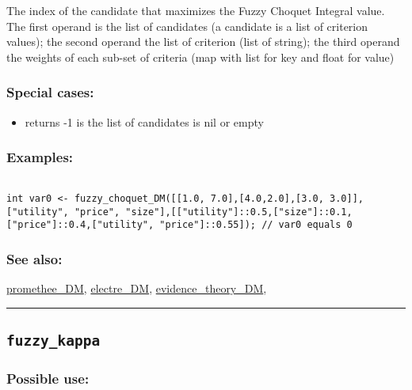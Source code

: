 \documentclass[]{book}
\providecommand{\tightlist}{%
  \setlength{\itemsep}{0pt}\setlength{\parskip}{0pt}}
\theoremstyle{definition}
\theoremstyle{definition}
\theoremstyle{definition}
\theoremstyle{remark}
\begin{document}
The index of the candidate that maximizes the Fuzzy Choquet Integral
value. The first operand is the list of candidates (a candidate is a
list of criterion values); the second operand the list of criterion
(list of string); the third operand the weights of each sub-set of
criteria (map with list for key and float for value)

\subsubsection{Special cases:}\label{special-cases-65}

\begin{itemize}
\tightlist
\item
  returns -1 is the list of candidates is nil or empty
\end{itemize}

\subsubsection{Examples:}\label{examples-130}

\begin{verbatim}
 
int var0 <- fuzzy_choquet_DM([[1.0, 7.0],[4.0,2.0],[3.0, 3.0]], ["utility", "price", "size"],[["utility"]::0.5,["size"]::0.1,["price"]::0.4,["utility", "price"]::0.55]); // var0 equals 0
\end{verbatim}

\subsubsection{See also:}\label{see-also-100}

\href{OperatorsNR\#promethee_dm}{promethee\_DM},
\href{OperatorsDH\#electre_dm}{electre\_DM},
\href{OperatorsDH\#evidence_theory_dm}{evidence\_theory\_DM},

\begin{center}\rule{0.5\linewidth}{\linethickness}\end{center}

\subsection{\texorpdfstring{\texttt{fuzzy\_kappa}}{fuzzy\_kappa}}\label{fuzzy_kappa}

\subsubsection{Possible use:}\label{possible-use-176}
\end{document}
